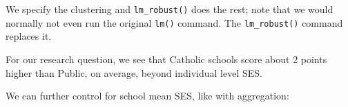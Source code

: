 \documentclass[
  letterpaper,
  DIV=11,
  numbers=noendperiod]{scrreprt}
\newenvironment{Shaded}{}{}
\newcommand{\AttributeTok}[1]{\textcolor[rgb]{0.49,0.56,0.16}{#1}}
\newcommand{\DecValTok}[1]{\textcolor[rgb]{0.25,0.63,0.44}{#1}}
\newcommand{\FunctionTok}[1]{\textcolor[rgb]{0.02,0.16,0.49}{#1}}
\newcommand{\NormalTok}[1]{#1}
\newcommand{\OtherTok}[1]{\textcolor[rgb]{0.00,0.44,0.13}{#1}}
\newcommand{\SpecialCharTok}[1]{\textcolor[rgb]{0.25,0.44,0.63}{#1}}
\begin{document}
We specify the clustering and \texttt{lm\_robust()} does the rest; note
that we would normally not even run the original \texttt{lm()} command.
The \texttt{lm\_robust()} command replaces it.

For our research question, we see that Catholic schools score about 2
points higher than Public, on average, beyond individual level SES.

We can further control for school mean SES, like with aggregation:

\begin{Shaded}
\end{Shaded}
\end{document}
